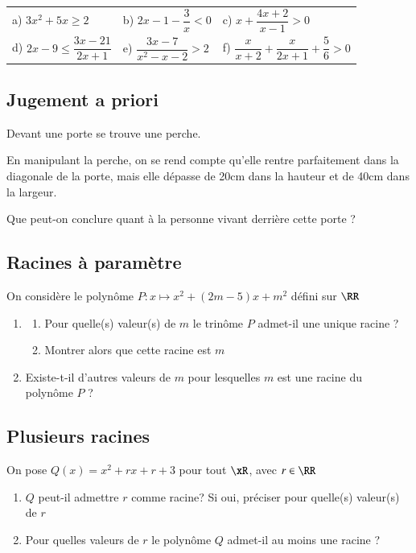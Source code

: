 \documentclass[oneside,12pt]{article}          %
\begin{document}
\renewcommand{\arraystretch}{2}
\begin{tabular}{p{} p{} p{} }
	a) $3x^2+5x \geq 2$ & b) $2x-1-\dfrac{3}{x}<0$ & c) $x+\dfrac{4x+2}{x-1} >0$ \\
	d) $2x-9\leq \dfrac{3x-21}{2x+1}$ & e) $\dfrac{3x-7}{x^2-x-2}>2$ & f) $\dfrac{x}{x+2}+\dfrac{x}{2x+1}+\dfrac{5}{6}>0$
\end{tabular}



\subsection{Jugement a priori}
Devant une porte se trouve une perche.

En manipulant la perche, on se rend compte qu'elle rentre parfaitement dans la diagonale de la porte, mais elle dépasse de 20cm dans la hauteur et de 40cm dans la largeur.

Que peut-on conclure quant à la personne vivant derrière cette porte ?



\subsection{Racines à paramètre}
On considère le polynôme $P:x\mapsto x^{2} + (2m-5)x +m^{2}$ défini sur $\RR$
\begin{enumerate}
	\item \begin{enumerate}
		\item Pour quelle(s) valeur(s) de $m$ le trinôme $P$ admet-il une unique racine ?
    	\item Montrer alors que cette racine est $m$
		\end{enumerate}
	\item Existe-t-il d'autres valeurs de $m$ pour lesquelles $m$ est une racine du polynôme $P$ ?    
\end{enumerate}



\subsection{Plusieurs racines}
On pose $Q(x)=x^2+rx+r+3$ pour tout $\xR$, avec $r\in\RR$
\begin{enumerate}
    \item $Q$ peut-il admettre $r$ comme racine? Si oui, préciser pour quelle(s) valeur(s) de $r$
    \item Pour quelles valeurs de $r$ le polynôme $Q$ admet-il au moins une racine ?
\end{enumerate}
\end{document}
